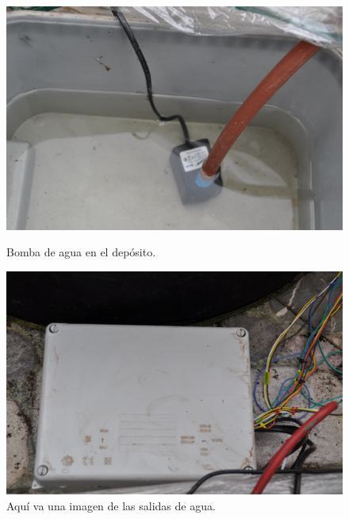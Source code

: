 \documentclass[a4paper, 12pt, oneside]{book}
\begin{document}
\begin{figure}[H]
  \centering
  \begin{minipage}[b]{0.4\textwidth}
    \includegraphics[width=\textwidth]{img/bomba_agua}
    \caption{Bomba de agua en el depósito.}
    \label{figura:bomba_agua}
  \end{minipage}
  \hfill
  \begin{minipage}[b]{0.4\textwidth}
    \includegraphics[width=\textwidth]{img/caja_registro_cerrada}
    \caption{Aquí va una imagen de las salidas de agua.}
    \label{figura:salidas_agua}
  \end{minipage}
\end{figure}
    
\end{document}
